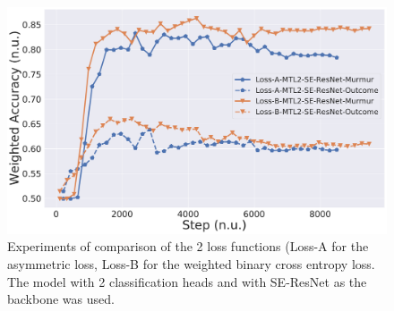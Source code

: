 

\begin{figure}[!htp]
\centering
\includegraphics[width=\linewidth]{images/clf-se-resnet-lossA-vs-lossB.pdf}
\caption[]
{Experiments of comparison of the 2 loss functions (Loss-A for the asymmetric loss, Loss-B for the weighted binary cross entropy loss. The model with 2 classification heads and with SE-ResNet as the backbone was used.}
\label{fig:clf-se-resnet-lossA-vs-lossB}
\end{figure}
